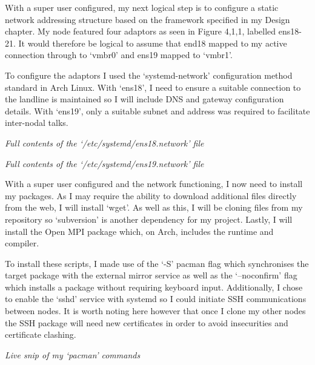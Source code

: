 With a super user configured, my next logical step is to configure a static network addressing structure based on the framework specified in my Design chapter. My node featured four adaptors as seen in Figure 4,1,1, labelled ens18-21. It would therefore be logical to assume that end18 mapped to my active connection through to `vmbr0' and ens19 mapped to `vmbr1'.

To configure the adaptors I used the `systemd-network' configuration method standard in Arch Linux. With `ens18', I need to ensure a suitable connection to the landline is maintained so I will include DNS and gateway configuration details. With `ens19', only a suitable subnet and address was required to facilitate inter-nodal talks.


\begin{center}
    \emph{Full contents of the `/etc/systemd/ens18.network' file}
\end{center}


\begin{center}
    \emph{Full contents of the `/etc/systemd/ens19.network' file}
\end{center}

With a super user configured and the network functioning, I now need to install my packages. As I may require the ability to download additional files directly from the web, I will install `wget'. As well as this, I will be cloning files from my repository so `subversion' is another dependency for my project. Lastly, I will install the Open MPI package which, on Arch, includes the runtime and compiler.

To install these scripts, I made use of the `-S' pacman flag which synchronises the target package with the external mirror service as well as the `--noconfirm' flag which installs a package without requiring keyboard input. Additionally, I chose to enable the `sshd' service with systemd so I could initiate SSH communications between nodes. It is worth noting here however that once I clone my other nodes the SSH package will need new certificates in order to avoid insecurities and certificate clashing.


\begin{center}
    \emph{Live snip of my `pacman' commands}
\end{center}

